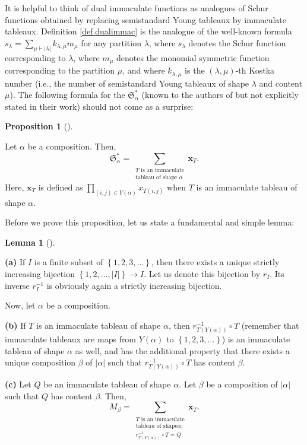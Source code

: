 \documentclass
[numbers=enddot,12pt,final,onecolumn,notitlepage,abstracton]{scrartcl}%
\theoremstyle{definition}
\newtheorem{lem}[theo]{Lemma}
\newenvironment{lemma}[1][]
{\begin{lem}[#1]\begin{leftbar}}
{\end{leftbar}\end{lem}}
\newtheorem{prop}[theo]{Proposition}
\newenvironment{proposition}[1][]
{\begin{prop}[#1]\begin{leftbar}}
{\end{leftbar}\end{prop}}
\let\sumnonlimits\sum
\let\prodnonlimits\prod
\renewcommand{\sum}{\sumnonlimits\limits}
\renewcommand{\prod}{\prodnonlimits\limits}
\begin{document}
It is helpful to think of dual immaculate functions as analogues of Schur
functions obtained by replacing semistandard Young tableaux by immaculate
tableaux. Definition \ref{def.dualimmac} is the analogue of the well-known
formula $s_{\lambda}=\sum_{\mu\vdash\left\vert \lambda\right\vert }%
k_{\lambda,\mu}m_{\mu}$ for any partition $\lambda$, where $s_{\lambda}$
denotes the Schur function corresponding to $\lambda$, where $m_{\mu}$ denotes
the monomial symmetric function corresponding to the partition $\mu$, and
where $k_{\lambda,\mu}$ is the $\left(  \lambda,\mu\right)  $-th Kostka number
(i.e., the number of semistandard Young tableaux of shape $\lambda$ and
content $\mu$). The following formula for the $\mathfrak{S}_{\alpha}^{\ast}$
(known to the authors of \cite{BBSSZ} but not explicitly stated in their work)
should not come as a surprise:

\begin{proposition}
\label{prop.dualImm}Let $\alpha$ be a composition. Then,%
\[
\mathfrak{S}_{\alpha}^{\ast}=\sum_{\substack{T\text{ is an immaculate}%
\\\text{tableau of shape }\alpha}}\mathbf{x}_{T}.
\]
Here, $\mathbf{x}_{T}$ is defined as $\prod_{\left(  i,j\right)  \in Y\left(
\alpha\right)  }x_{T\left(  i,j\right)  }$ when $T$ is an immaculate tableau
of shape $\alpha$.
\end{proposition}

Before we prove this proposition, let us state a fundamental and simple lemma:

\begin{lemma}
\label{lem.dualImm.trivia}\textbf{(a)} If $I$ is a finite subset of $\left\{
1,2,3,\ldots\right\}  $, then there exists a unique strictly increasing
bijection $\left\{  1,2,\ldots,\left\vert I\right\vert \right\}  \rightarrow
I$. Let us denote this bijection by $r_{I}$. Its inverse $r_{I}^{-1}$ is
obviously again a strictly increasing bijection.

Now, let $\alpha$ be a composition.

\textbf{(b)} If $T$ is an immaculate tableau of shape $\alpha$, then
$r_{T\left(  Y\left(  \alpha\right)  \right)  }^{-1}\circ T$ (remember that
immaculate tableaux are maps from $Y\left(  \alpha\right)  $ to $\left\{
1,2,3,\ldots\right\}  $) is an immaculate tableau of shape $\alpha$ as well,
and has the additional property that there exists a unique composition $\beta$
of $\left\vert \alpha\right\vert $ such that $r_{T\left(  Y\left(
\alpha\right)  \right)  }^{-1}\circ T$ has content $\beta$.

\textbf{(c)} Let $Q$ be an immaculate tableau of shape $\alpha$. Let $\beta$
be a composition of $\left\vert \alpha\right\vert $ such that $Q$ has content
$\beta$. Then,%
\begin{equation}
M_{\beta}=\sum_{\substack{T\text{ is an immaculate}\\\text{tableau of shape
}\alpha;\\r_{T\left(  Y\left(  \alpha\right)  \right)  }^{-1}\circ
T=Q}}\mathbf{x}_{T}. \label{pf.dualImm.M}%
\end{equation}

\end{lemma}
\end{document}
